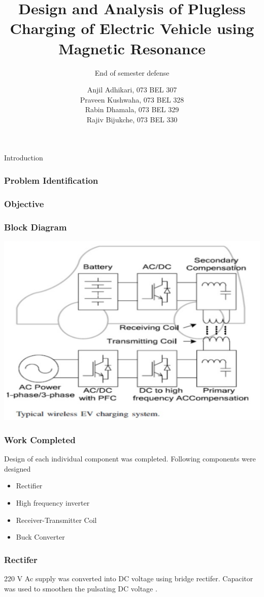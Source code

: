 \documentclass{beamer}
\title[Short Paper Title] %
{Design and Analysis of Plugless Charging of Electric Vehicle using Magnetic Resonance}
\subtitle
{End of semester defense} %
\author[]{Anjil Adhikari, 073 BEL 307 \\
Praveen Kushwaha, 073 BEL 328 \\
Rabin Dhamala, 073 BEL 329 \\
Rajiv Bijukche, 073 BEL 330 
}
\begin{document}
\frame{\titlepage}
\begin{frame}{Introduction}

\end{frame}

\begin{frame}
  \frametitle{Problem Identification}
\end{frame}

\begin{frame}
\frametitle{Objective}

\end{frame}

\begin{frame}
  \begin{center}
  \frametitle{Block Diagram}
\includegraphics[scale=0.5]{jpgs/wirelessEV.PNG}
  \end{center}
\end{frame}

\begin{frame}
  \frametitle{Work Completed}
  Design of each individual component was completed. Following components were designed
  \begin{itemize}
    \item Rectifier
    \item High frequency inverter
    \item Receiver-Transmitter Coil
    \item Buck Converter
  \end{itemize}
\end{frame}

\begin{frame}
  \frametitle{Rectifer}
  220 V Ac supply was converted into DC voltage using bridge rectifer. Capacitor was used to smoothen the pulsating DC voltage . 

\end{frame}
\end{document}
